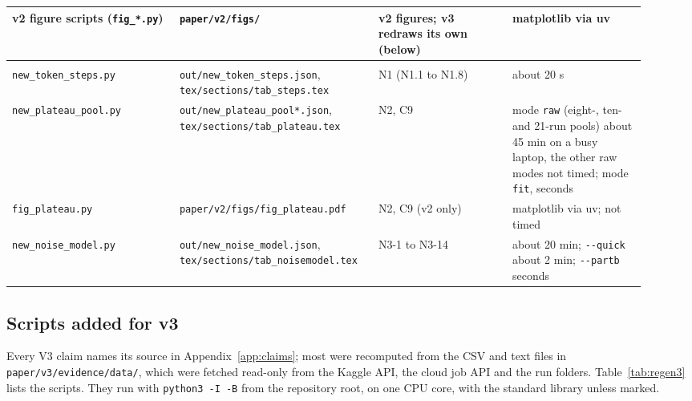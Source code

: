 {\begin{longtable}{@{}>{\raggedright\arraybackslash}p{0.25\linewidth}>{\raggedright\arraybackslash}p{0.27\linewidth}>{\raggedright\arraybackslash}p{0.2\linewidth}>{\raggedright\arraybackslash}p{0.2\linewidth}@{}}
v2 figure scripts (\texttt{fig\_\allowbreak{}*.py}) & \texttt{paper/\allowbreak{}v2/\allowbreak{}figs/} & v2 figures; v3 redraws its own (below) & matplotlib via uv \\ %
\midrule
\multicolumn{4}{@{}p{0.96\linewidth}}{\textit{Checks on the curve and the noise (Appendix~\ref{app:curve-checks})}} \\*
\texttt{new\_\allowbreak{}token\_\allowbreak{}steps.py} & \texttt{out/\allowbreak{}new\_\allowbreak{}token\_\allowbreak{}steps.json}, \texttt{tex/\allowbreak{}sections/\allowbreak{}tab\_\allowbreak{}steps.tex} & N1 (N1.1 to N1.8) & about 20 s \\ %
\texttt{new\_\allowbreak{}plateau\_\allowbreak{}pool.py} & \texttt{out/\allowbreak{}new\_\allowbreak{}plateau\_\allowbreak{}pool*.json}, \texttt{tex/\allowbreak{}sections/\allowbreak{}tab\_\allowbreak{}plateau.tex} & N2, C9 & mode \texttt{raw} (eight-, ten- and 21-run pools) about 45 min on a busy laptop, the other raw modes not timed; mode \texttt{fit}, seconds \\ %
\texttt{fig\_\allowbreak{}plateau.py} & \texttt{paper/\allowbreak{}v2/\allowbreak{}figs/\allowbreak{}fig\_\allowbreak{}plateau.pdf} & N2, C9 (v2 only) & matplotlib via uv; not timed \\ %
\texttt{new\_\allowbreak{}noise\_\allowbreak{}model.py} & \texttt{out/\allowbreak{}new\_\allowbreak{}noise\_\allowbreak{}model.json}, \texttt{tex/\allowbreak{}sections/\allowbreak{}tab\_\allowbreak{}noisemodel.tex} & N3-1 to N3-14 & about 20 min; \texttt{-{}-quick} about 2 min; \texttt{-{}-partb} seconds \\ %
\end{longtable}
}

\subsection{Scripts added for v3}
Every V3 claim names its source in Appendix~\ref{app:claims}; most were recomputed from the CSV and text files in \texttt{paper/v3/evidence/data/}, which were fetched read-only from the Kaggle API, the cloud job API and the run folders. %
Table~\ref{tab:regen3} lists the scripts. They run with \texttt{python3 -I -B} from the repository root, on one CPU core, with the standard library unless marked.

